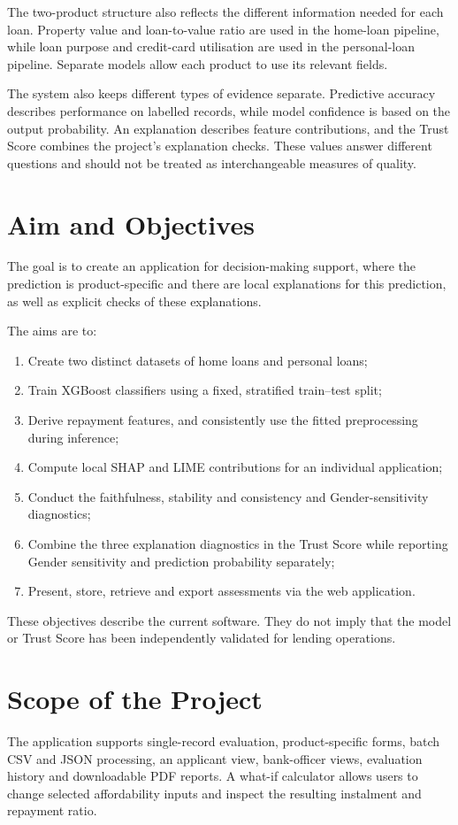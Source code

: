 The two-product structure also reflects the different information needed for each loan. Property value and loan-to-value ratio are used in the home-loan pipeline, while loan purpose and credit-card utilisation are used in the personal-loan pipeline. Separate models allow each product to use its relevant fields.

The system also keeps different types of evidence separate. Predictive accuracy describes performance on labelled records, while model confidence is based on the output probability. An explanation describes feature contributions, and the Trust Score combines the project's explanation checks. These values answer different questions and should not be treated as interchangeable measures of quality.

\section{Aim and Objectives}
The goal is to create an application for decision-making support, where the prediction is product-specific and there are local explanations for this prediction, as well as explicit checks of these explanations.

The aims are to:
\begin{enumerate}
\item Create two distinct datasets of home loans and personal loans;
\item  Train XGBoost classifiers using a fixed, stratified train--test split;
\item Derive repayment features, and consistently use the fitted preprocessing during inference;
\item Compute local SHAP and LIME contributions for an individual application;
\item Conduct the faithfulness, stability and consistency and Gender-sensitivity diagnostics;
\item Combine the three explanation diagnostics in the Trust Score while reporting Gender sensitivity and prediction probability separately;
\item Present, store, retrieve and export assessments via the web application.
\end{enumerate}

These objectives describe the current software. They do not imply that the model or Trust Score has been independently validated for lending operations.

\section{Scope of the Project}
The application supports single-record evaluation, product-specific forms, batch CSV and JSON processing, an applicant view, bank-officer views, evaluation history and downloadable PDF reports. A what-if calculator allows users to change selected affordability inputs and inspect the resulting instalment and repayment ratio.

